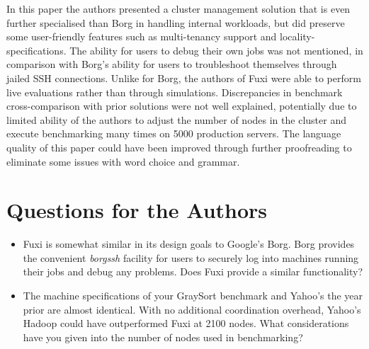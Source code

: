 \documentclass[11pt]{article}
\begin{document}
In this paper the authors presented a cluster management solution that is even further specialised than Borg in handling internal workloads, but did preserve some user-friendly features such as multi-tenancy support and locality-specifications. The ability for users to debug their own jobs was not mentioned, in comparison with Borg's ability for users to troubleshoot themselves through jailed SSH connections. Unlike for Borg, the authors of Fuxi were able to perform live evaluations rather than through simulations. Discrepancies in benchmark cross-comparison with prior solutions were not well explained, potentially due to limited ability of the authors to adjust the number of nodes in the cluster and execute benchmarking many times on 5000 production servers. The language quality of this paper could have been improved through further proofreading to eliminate some issues with word choice and grammar.

\section*{Questions for the Authors}

\begin{itemize}
	\item Fuxi is somewhat similar in its design goals to Google's Borg. Borg provides the convenient \emph{borgssh} facility for users to securely log into machines running their jobs and debug any problems. Does Fuxi provide a similar functionality?
	\item The machine specifications of your GraySort benchmark and Yahoo's the year prior are almost identical. With no additional coordination overhead, Yahoo's Hadoop could have outperformed Fuxi at 2100 nodes. What considerations have you given into the number of nodes used in benchmarking?
\end{itemize}


\footnotesize{}
\end{document}
